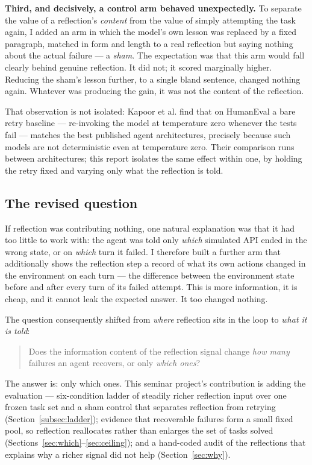 \documentclass[a4paper, 12pt]{article}
\begin{document}
\textbf{Third, and decisively, a control arm behaved unexpectedly.} To separate
the value of a reflection's \emph{content} from the value of simply attempting
the task again, I added an arm in which the model's own lesson was replaced by a
fixed paragraph, matched in form and length to a real reflection but saying
nothing about the actual failure --- a \emph{sham}. The expectation was that
this arm would fall clearly behind genuine reflection. It did not; it scored
marginally higher. Reducing the sham's lesson further, to a single bland sentence,
changed nothing again. Whatever was producing the gain, it was not the content
of the reflection.

That observation is not isolated: Kapoor et al. \cite{kapoor2024agents} find that on
HumanEval a bare retry baseline — re-invoking the model at temperature zero whenever
the tests fail — matches the best published agent architectures, precisely because such models
are not deterministic even at temperature zero. Their comparison runs between architectures; this report
isolates the same effect within one, by holding the retry fixed and varying only what the reflection is told.

\subsection{The revised question}

If reflection was contributing nothing, one natural explanation was that it had
too little to work with: the agent was told only \emph{which} simulated API
ended in the wrong state, or on \emph{which} turn it failed. I therefore built a
further arm that additionally shows the reflection step a record of what its own
actions changed in the environment on each turn --- the difference between the
environment state before and after every turn of its failed attempt. This is
more information, it is cheap, and it cannot leak the expected answer. It too
changed nothing.

The question consequently shifted from \emph{where} reflection sits in the loop
to \emph{what it is told}:

\begin{quote}
Does the information content of the reflection signal change \emph{how many}
failures an agent recovers, or only \emph{which ones}?
\end{quote}

The answer is: only which ones. This seminar project's contribution is adding the
evaluation --- six-condition ladder of steadily richer reflection input over one frozen task set
and a sham control that separates reflection from retrying (Section~\ref{subsec:ladder}); evidence that
recoverable failures form a small fixed pool, so reflection reallocates rather
than enlarges the set of tasks solved (Sections~\ref{sec:which}--\ref{sec:ceiling});
and a hand-coded audit of the reflections that explains why a richer signal did not help
(Section~\ref{sec:why}).
\end{document}
